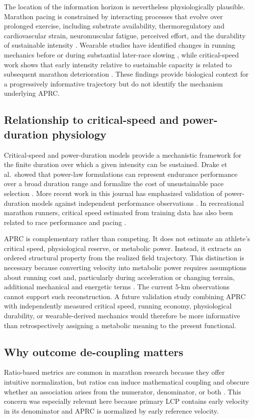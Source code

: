 \documentclass[pdflatex,sn-basic]{sn-jnl}
\begin{document}
The location of the information horizon is nevertheless physiologically plausible. Marathon pacing is constrained by interacting processes that evolve over prolonged exercise, including substrate availability, thermoregulatory and cardiovascular strain, neuromuscular fatigue, perceived effort, and the durability of sustainable intensity \citep{Azevedo2021}. Wearable studies have identified changes in running mechanics before or during substantial later-race slowing \citep{Meyer2021,Miyazaki2025}, while critical-speed work shows that early intensity relative to sustainable capacity is related to subsequent marathon deterioration \citep{SmythMuniz2020}. These findings provide biological context for a progressively informative trajectory but do not identify the mechanism underlying APRC.

\subsection{Relationship to critical-speed and power-duration physiology}
Critical-speed and power-duration models provide a mechanistic framework for the finite duration over which a given intensity can be sustained. Drake et al.\ showed that power-law formulations can represent endurance performance over a broad duration range and formalize the cost of unsustainable pace selection \citep{Drake2024}. More recent work in this journal has emphasized validation of power-duration models against independent performance observations \citep{WahlJi2026}. In recreational marathon runners, critical speed estimated from training data has also been related to race performance and pacing \citep{SmythMuniz2020}.

APRC is complementary rather than competing. It does not estimate an athlete's critical speed, physiological reserve, or metabolic power. Instead, it extracts an ordered structural property from the realized field trajectory. This distinction is necessary because converting velocity into metabolic power requires assumptions about running cost and, particularly during acceleration or changing terrain, additional mechanical and energetic terms \citep{Briand2025}. The current 5-km observations cannot support such reconstruction. A future validation study combining APRC with independently measured critical speed, running economy, physiological durability, or wearable-derived mechanics would therefore be more informative than retrospectively assigning a metabolic meaning to the present functional.

\subsection{Why outcome de-coupling matters}
Ratio-based metrics are common in marathon research because they offer intuitive normalization, but ratios can induce mathematical coupling and obscure whether an association arises from the numerator, denominator, or both . This concern was especially relevant here because primary LCP contains early velocity in its denominator and APRC is normalized by early reference velocity.
\end{document}
